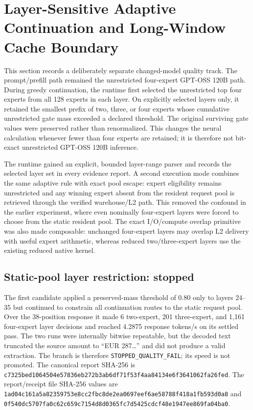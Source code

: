 \section{Layer-Sensitive Adaptive Continuation and Long-Window Cache Boundary}
\label{sec:gptoss120b-layer-sensitive-quality-20260911}

This section records a deliberately separate changed-model quality track.  The
prompt/prefill path remained the unrestricted four-expert GPT-OSS 120B path.
During greedy continuation, the runtime first selected the unrestricted top
four experts from all 128 experts in each layer.  On explicitly selected layers
only, it retained the smallest prefix of two, three, or four experts whose
cumulative unrestricted gate mass exceeded a declared threshold.  The original
surviving gate values were preserved rather than renormalized.  This changes
the neural calculation whenever fewer than four experts are retained; it is
therefore not bit-exact unrestricted GPT-OSS 120B inference.

The runtime gained an explicit, bounded layer-range parser and records the
selected layer set in every evidence report.  A second execution mode combines
the same adaptive rule with exact pool escape: expert eligibility remains
unrestricted and any winning expert absent from the resident request pool is
retrieved through the verified warehouse/L2 path.  This removed the confound in
the earlier experiment, where even nominally four-expert layers were forced to
choose from the static resident pool.  The exact I/O/compute overlap primitive
was also made composable: unchanged four-expert layers may overlap L2 delivery
with useful expert arithmetic, whereas reduced two/three-expert layers use the
existing reduced native kernel.

\subsection{Static-pool layer restriction: stopped}

The first candidate applied a preserved-mass threshold of 0.80 only to layers
24--35 but continued to constrain all continuation routes to the static
request pool.  Over the 38-position response it made 6 two-expert, 201
three-expert, and 1,161 four-expert layer decisions and reached 4.2875 response
tokens/s on its settled pass.  The two runs were internally bitwise repeatable,
but the decoded text truncated the source amount to ``EUR 287\ldots'' and did
not produce a valid extraction.  The branch is therefore
\texttt{STOPPED\_QUALITY\_FAIL}; its speed is not promoted.  The canonical
report SHA-256 is
\texttt{c7325bed1064504e57836eb272b3ab6df71f53f4aa84134e6f3641062fa26fed}.
The report/receipt file SHA-256 values are
\texttt{1ad04c161a5a82359753e8cc2fbc8de2ea0697eef6ae58788f418a1fb593d0a8}
and
\texttt{0f540dc5707fa0c62c659c7154d8d0365fc7d5425cdcf48e1947ee869fa04ba0}.

